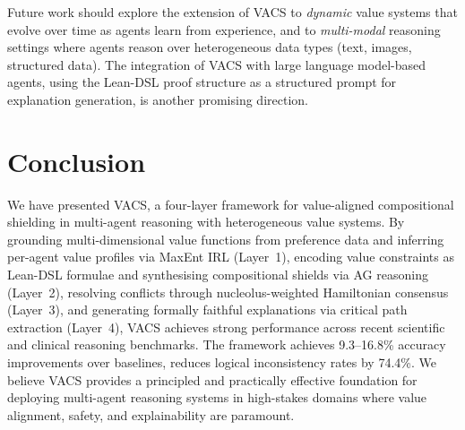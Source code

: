 \documentclass[12pt,a4paper]{article}
\begin{document}
Future work should explore the extension of VACS to \emph{dynamic} value systems that
evolve over time as agents learn from experience, and to \emph{multi-modal} reasoning
settings where agents reason over heterogeneous data types (text, images, structured
data). The integration of VACS with large language model-based agents, using the
Lean-DSL proof structure as a structured prompt for explanation generation, is another
promising direction.

\section{Conclusion}
\label{sec:conclusion}

We have presented VACS, a four-layer framework for value-aligned compositional
shielding in multi-agent reasoning with heterogeneous value systems. By grounding
multi-dimensional value functions from preference data and inferring per-agent value
profiles via MaxEnt IRL (Layer~1), encoding value constraints as Lean-DSL formulae
and synthesising compositional shields via AG reasoning (Layer~2), resolving conflicts
through nucleolus-weighted Hamiltonian consensus (Layer~3), and generating formally
faithful explanations via critical path extraction (Layer~4), VACS achieves strong performance across recent scientific and clinical reasoning benchmarks. The framework
achieves 9.3--16.8\% accuracy improvements over baselines, reduces logical
inconsistency rates by 74.4\%. We believe VACS provides a principled and
practically effective foundation for deploying multi-agent reasoning systems in
high-stakes domains where value alignment, safety, and explainability are paramount.

% 


\end{document}
